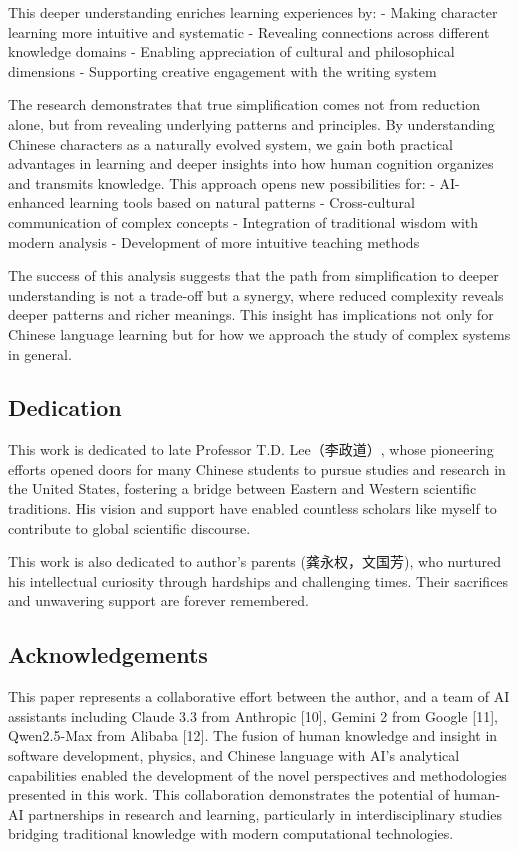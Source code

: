 This deeper understanding enriches learning experiences by: - Making
character learning more intuitive and systematic - Revealing connections
across different knowledge domains - Enabling appreciation of cultural
and philosophical dimensions - Supporting creative engagement with the
writing system

The research demonstrates that true simplification comes not from
reduction alone, but from revealing underlying patterns and principles.
By understanding Chinese characters as a naturally evolved system, we
gain both practical advantages in learning and deeper insights into how
human cognition organizes and transmits knowledge. This approach opens
new possibilities for: - AI-enhanced learning tools based on natural
patterns - Cross-cultural communication of complex concepts -
Integration of traditional wisdom with modern analysis - Development of
more intuitive teaching methods

The success of this analysis suggests that the path from simplification
to deeper understanding is not a trade-off but a synergy, where reduced
complexity reveals deeper patterns and richer meanings. This insight has
implications not only for Chinese language learning but for how we
approach the study of complex systems in general.

\subsection{Dedication}\label{dedication}

This work is dedicated to late Professor T.D. Lee（李政道）, whose
pioneering efforts opened doors for many Chinese students to pursue
studies and research in the United States, fostering a bridge between
Eastern and Western scientific traditions. His vision and support have
enabled countless scholars like myself to contribute to global
scientific discourse.

This work is also dedicated to author's parents (龚永权，文国芳), who
nurtured his intellectual curiosity through hardships and challenging
times. Their sacrifices and unwavering support are forever remembered.

\subsection{Acknowledgements}\label{acknowledgements}

This paper represents a collaborative effort between the author, and a
team of AI assistants including Claude 3.3 from Anthropic {[}10{]},
Gemini 2 from Google {[}11{]}, Qwen2.5-Max from Alibaba {[}12{]}. The
fusion of human knowledge and insight in software development, physics,
and Chinese language with AI's analytical capabilities enabled the
development of the novel perspectives and methodologies presented in
this work. This collaboration demonstrates the potential of human-AI
partnerships in research and learning, particularly in interdisciplinary
studies bridging traditional knowledge with modern computational
technologies.

